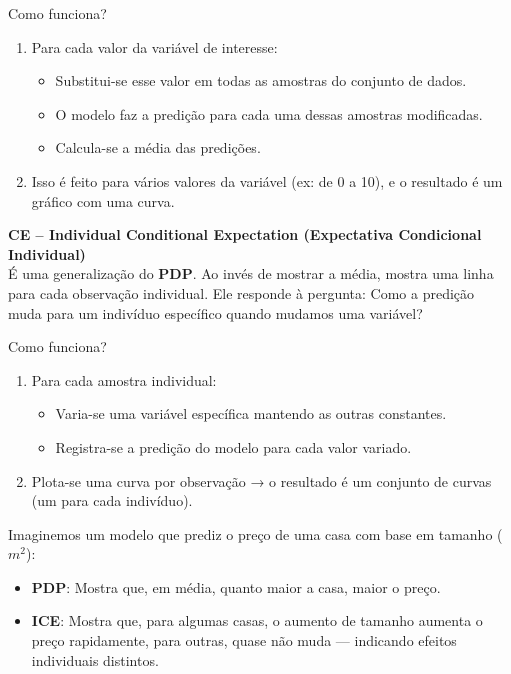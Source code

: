 Como funciona? \vspace{-1em}
\begin{enumerate}[]
	\item Para cada valor da variável de interesse: \vspace{-1em}
	\begin{itemize}[]
		\item Substitui-se esse valor em todas as amostras do conjunto de dados.
		\item O modelo faz a predição para cada uma dessas amostras modificadas.
		\item Calcula-se a média das predições.
	\end{itemize}
	\item Isso é feito para vários valores da variável (ex: de 0 a 10), e o resultado é um gráfico com uma curva.
\end{enumerate}

\textbf{CE – Individual Conditional Expectation (Expectativa Condicional Individual)} \\
É uma generalização do \textbf{PDP}. Ao invés de mostrar a média, mostra uma linha para cada observação individual. Ele responde à pergunta: Como a predição muda para um indivíduo específico quando mudamos uma variável?

Como funciona? \vspace{-1em}
\begin{enumerate}[]
	\item Para cada amostra individual:
	\begin{itemize}[]
		\item Varia-se uma variável específica mantendo as outras constantes.
		\item Registra-se a predição do modelo para cada valor variado.
	\end{itemize}
	\item Plota-se uma curva por observação → o resultado é um conjunto de curvas (um para cada indivíduo).
\end{enumerate}

Imaginemos um modelo que prediz o preço de uma casa com base em tamanho ($m^2$): \vspace{-1em}
\begin{itemize}[]
	\item \textbf{PDP}: Mostra que, em média, quanto maior a casa, maior o preço.
	\item \textbf{ICE}: Mostra que, para algumas casas, o aumento de tamanho aumenta o preço rapidamente, para outras, quase não muda — indicando efeitos individuais distintos.
\end{itemize}

